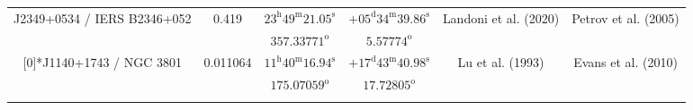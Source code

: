 \begin{landscape}
\begin{longtable}{cccccc}
\multirow{2}[0]{*}{J2349+0534 / IERS B2346+052} & \multirow{2}[0]{*}{0.419} &  
    $23^\text{h}49^\text{m}21.05^\text{s}$  & $+05^\text{d}34^\text{m}39.86^\text{s}$  & 
    \multirow{2}[0]{*}{Landoni et al. (2020)\cite{RedRef48_2020}}& \multirow{2}[0]{*}{Petrov et al. (2005) \cite{CoordRef35_2005}} \\*
    & & $357.33771^\text{o}$ & $5.57774^\text{o}$ & & \\ \addlinespace 

 \multirow{2}[0]{*}{J1140+1743 / NGC 3801} & \multirow{2}[0]{*}{0.011064} &  
    $11^\text{h}40^\text{m}16.94^\text{s}$  & $+17^\text{d}43^\text{m}40.98^\text{s}$  & 
    \multirow{2}[0]{*}{Lu et al. (1993)\cite{RedRef88_1993}}& \multirow{2}[0]{*}{Evans et al. (2010) \cite{CoordRef1_2010}} \\*
    & & $175.07059^\text{o}$ & $17.72805^\text{o}$ & & \\ \addlinespace 


\end{longtable}
\end{landscape}
